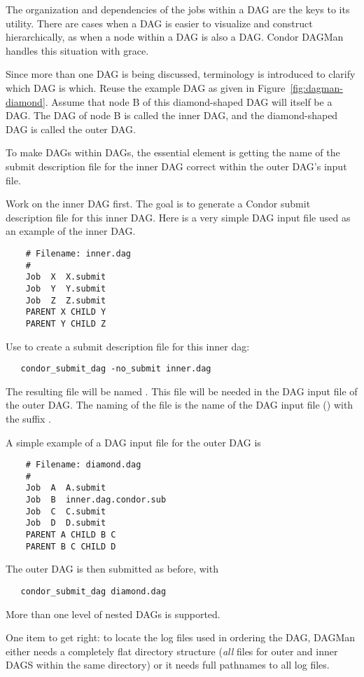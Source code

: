 The organization and dependencies of the jobs within a DAG
are the keys to its utility.
There are cases when a DAG is easier to visualize and 
construct hierarchically,
as when a node within a DAG is also a DAG.
Condor DAGMan handles this situation with grace.

Since more than one DAG is being discussed, 
terminology is introduced to clarify which DAG is which. 
Reuse the example DAG as given in 
Figure~\ref{fig:dagman-diamond}.
Assume that node B of this diamond-shaped DAG
will itself be a DAG.
The DAG of node B is called the inner DAG,
and the diamond-shaped DAG is called the outer DAG.

To make DAGs within DAGs,
the essential element is getting the name of the submit description
file for the inner DAG correct within the outer DAG's input
file.

Work on the inner DAG first.
The goal is to generate a Condor submit description file for this inner DAG.
Here is a very simple DAG input file used as an example of the inner DAG.
\begin{verbatim}
	# Filename: inner.dag
	#
	Job  X  X.submit
	Job  Y  Y.submit
	Job  Z  Z.submit
	PARENT X CHILD Y
	PARENT Y CHILD Z
\end{verbatim}

Use  to create a submit description file for this
inner dag:
\begin{verbatim}
   condor_submit_dag -no_submit inner.dag
\end{verbatim}
The resulting file will be named .
This file will be needed in the DAG input file of the outer DAG.
The naming of the file is the name of the DAG input file
() with the suffix .

A simple example of a DAG input file for the outer DAG is
\begin{verbatim}
	# Filename: diamond.dag
	#
	Job  A  A.submit 
	Job  B  inner.dag.condor.sub
	Job  C  C.submit	
	Job  D  D.submit
	PARENT A CHILD B C
	PARENT B C CHILD D
\end{verbatim}

The outer DAG is then submitted as before, with
\begin{verbatim}
   condor_submit_dag diamond.dag
\end{verbatim}

More than one level of nested DAGs is supported.

One item to get right:
to locate the log files used in ordering the DAG,
DAGMan either needs a completely flat directory structure
(\emph{all} files for outer and inner DAGS within the same directory)
or
it needs full pathnames to all log files.
